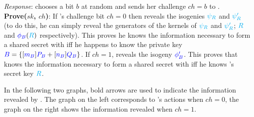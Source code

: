 \begin{center}
\end{center}

\noindent
\emph{Response}: \alice chooses a bit $b$ at random and sends her challenge $ch = b$ to \bob.\\

\noindent
\textbf{Prove($sk$, $ch$)}: If \alice's challenge bit $ch = 0$ then \bob reveals the isogenies $\textcolor{cyan}{\psi_R}$ and $\textcolor{cyan}{\psi'_R}$ (to do this, he can simply reveal the generators of the kernels of $\textcolor{cyan}{\psi_R}$ and $\textcolor{cyan}{\psi'_R}$; $\textcolor{cyan}{R}$ and $\textcolor{blue}{\phi_B}(\textcolor{cyan}{R})$ respectively). This proves he knows the information necessary to form a shared secret with \randall iff he happens to know the private key $\textcolor{blue}{B} = \{[\textcolor{blue}{m_B}]\textcolor{blue}{P_B} + [\textcolor{blue}{n_B}]\textcolor{blue}{Q_B}\}$. If $ch = 1$, \bob reveals the isogeny $\textcolor{blue}{\phi'_B}$. This proves that \bob knows the information necessary to form a shared secret with \randall iff he knows \randall's secret key $\textcolor{cyan}{R}$.

In the following two graphs, bold arrows are used to indicate the information revealed by \bob. The graph on the left corresponds to \bob's actions when $ch = 0$, the graph on the right shows the information revealed when $ch = 1$.

